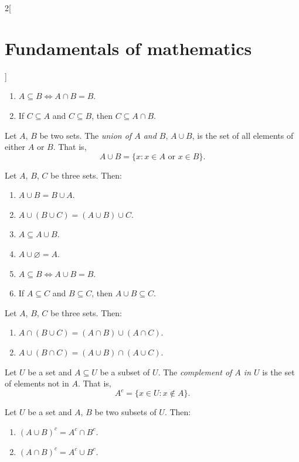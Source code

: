 \documentclass[../../../main.tex]{subfiles}
\begin{document}
\begin{multicols}{2}[\section{Fundamentals of mathematics}]
\begin{prop}
\begin{enumerate}
            \item $A\subseteq B\iff A\cap B=B$.
            \item If $C\subseteq A$ and $C\subseteq B$, then $C\subseteq A\cap B$.
        \end{enumerate}
    \end{prop}
    \begin{definition}
        Let $A$, $B$ be two sets. The \textit{union of $A$ and $B$}, $A\cup B$, is the set of all elements of either $A$ or $B$. That is, $$A\cup B=\{x:x\in A\text{ or }x\in B\}.$$
    \end{definition}
    \begin{prop}
        Let $A$, $B$, $C$ be three sets. Then:
        \begin{enumerate}
            \item $A\cup B=B\cup A$.
            \item $A\cup(B\cup C)=(A\cup B)\cup C$.
            \item $A\subseteq A\cup B$.
            \item $A\cup\varnothing=A$.
            \item $A\subseteq B\iff A\cup B=B$.
            \item If $A\subseteq C$ and $B\subseteq C$, then $A\cup B\subseteq C$.
        \end{enumerate}
    \end{prop}
    \begin{prop}
        Let $A$, $B$, $C$ be three sets. Then:
        \begin{enumerate}
            \item $A\cap (B\cup C)=(A\cap B)\cup (A\cap C)$.
            \item $A\cup (B\cap C)=(A\cup B)\cap (A\cup C)$.
        \end{enumerate}
    \end{prop}
    \begin{definition}
        Let $U$ be a set and $A\subseteq U$ be a subset of $U$. The \textit{complement of $A$ in $U$} is the set of elements not in $A$. That is, $$A^c=\{x\in U:x\notin A\}.$$
    \end{definition}
    \begin{prop}
        Let $U$ be a set and $A$, $B$ be two subsets of $U$. Then:
        \begin{enumerate}
            \item $(A\cup B)^c=A^c\cap B^c$.
            \item $(A\cap B)^c=A^c\cup B^c$.

\end{enumerate}
\end{prop}
\end{multicols}
\end{document}
